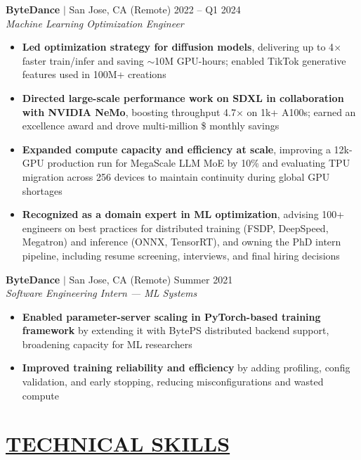 \documentclass[overlapped,line,11pt]{res}
\begin{document}
\begin{resume}
\textbf{ByteDance} $|$ San Jose, CA (Remote) \hfill 2022 -- Q1 2024\\
{\sl Machine Learning Optimization Engineer}
\vspace{4pt}
\begin{itemize} \itemsep 2pt
  \item \textbf{Led optimization strategy for diffusion models}, delivering up to 4$\times$ faster train/infer and saving $\sim$10M GPU-hours; enabled TikTok generative features used in 100M+ creations
  \item \textbf{Directed large-scale performance work on SDXL in collaboration with NVIDIA NeMo}, boosting throughput 4.7$\times$ on 1k+ A100s; earned an excellence award and drove multi-million \$ monthly savings
  \item \textbf{Expanded compute capacity and efficiency at scale}, improving a 12k-GPU production run for MegaScale LLM MoE by 10\% and evaluating TPU migration across 256 devices to maintain continuity during global GPU shortages
  \item \textbf{Recognized as a domain expert in ML optimization}, advising 100+ engineers on best practices for distributed training (FSDP, DeepSpeed, Megatron) and inference (ONNX, TensorRT), and owning the PhD intern pipeline, including resume screening, interviews, and final hiring decisions


\end{itemize}


\textbf{ByteDance} $|$ San Jose, CA (Remote) \hfill Summer 2021\\
{\sl Software Engineering Intern — ML Systems}
\vspace{4pt}
\begin{itemize} \itemsep 2pt
  \item \textbf{Enabled parameter-server scaling in PyTorch-based training framework} by extending it with BytePS distributed backend support, broadening capacity for ML researchers
  \item \textbf{Improved training reliability and efficiency} by adding profiling, config validation, and early stopping, reducing misconfigurations and wasted compute
\end{itemize}


\section{\underline{TECHNICAL SKILLS}}
\vspace{4pt}


\end{resume}
\end{document}
